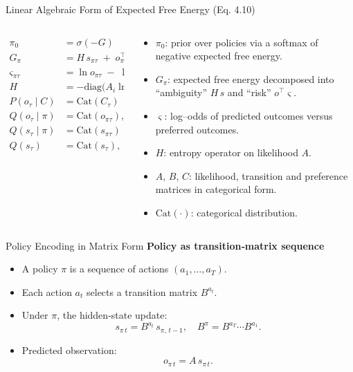 \documentclass[aspectratio=1610, english]{beamer}
\begin{document}
\begin{frame}{Linear Algebraic Form of Expected Free Energy (Eq. 4.10)}
\begin{columns}[t]
  \begin{column}{0.4\textwidth}
    \[
    \begin{aligned}
    \pi_0 &= \sigma(-G) \\[6pt]
    G_\pi &= H \, s_{\pi\tau} \;+\; o_{\pi\tau}^\top\,\varsigma_{\pi\tau} \\[4pt]
    \varsigma_{\pi\tau} &= \ln o_{\pi\tau} \;-\; \ln C_\tau \\[4pt]
    H &= -\mathrm{diag}\bigl(A_i \ln A_i\bigr) \\[4pt]
    P(o_\tau \!\mid\! C) &= \mathrm{Cat}(C_\tau) \\[4pt]
    Q(o_\tau \!\mid\! \pi) &= \mathrm{Cat}(o_{\pi\tau}),\quad o_{\pi\tau}=A\,s_{\pi\tau} \\[4pt]
    Q(s_\tau \!\mid\! \pi) &= \mathrm{Cat}(s_{\pi\tau}) \\[4pt]
    Q(s_\tau) &= \mathrm{Cat}(s_\tau),\quad s_\tau = \sum_{\pi} \pi\,s_{\pi\tau}
    \end{aligned}
    \]
  \end{column}
  \begin{column}{0.58\textwidth}
    \begin{itemize}
      \item \(\pi_0\): prior over policies via a softmax of negative expected free energy.  
      \item \(G_\pi\): expected free energy decomposed into “ambiguity” \(H\,s\) and “risk” \(o^\top\varsigma\).  
      \item \(\varsigma\): log–odds of predicted outcomes versus preferred outcomes.  
      \item \(H\): entropy operator on likelihood \(A\).  
      \item \(A\), \(B\), \(C\): likelihood, transition and preference matrices in categorical form.  
      \item \(\mathrm{Cat}(\cdot)\): categorical distribution.  
    \end{itemize}
  \end{column}
\end{columns}
\end{frame}

\begin{frame}{Policy Encoding in Matrix Form}
    \textbf{Policy as transition‐matrix sequence}
    \begin{itemize}
      \item A policy \(\pi\) is a sequence of actions \((a_1,\dots,a_T)\).
      \item Each action \(a_t\) selects a transition matrix \(B^{a_t}\).
      \item Under \(\pi\), the hidden‐state update:
      \[
        s_{\pi\,t}
        = B^{a_t}\,s_{\pi,\,t-1},
        \quad
        B^\pi = B^{a_T}\cdots B^{a_1}.
      \]
      \item Predicted observation:
      \[
        o_{\pi\,t} = A\,s_{\pi\,t}.
      \]
    \end{itemize}
\end{frame}
\end{document}
